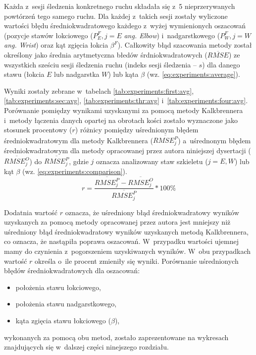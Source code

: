 Każda z~sesji śledzenia konkretnego ruchu składała się z~5 nieprzerywanych powtórzeń tego samego ruchu. Dla każdej z~takich sesji zostały wyliczone wartości błędu średniokwadratowego każdego z~wyżej wymienionych oszacowań (pozycje stawów łokciowego ($P^F_E, j = E$  \emph{ang. Elbow}) i~nadgarstkowego ($P^F_W, j = W$ \emph{ang. Wrist}) oraz kąt zgięcia łokcia $\beta^F$). Całkowity błąd szacowania metody został określony jako średnia arytmetyczna błedów śrdniokwadratowych ($\overline{RMSE}$) ze wszystkich sześciu sesji śledzenia ruchu (indeks sesji śledzenia -- $s$) dla danego stawu (łokcia $E$ lub nadgarstka $W$) lub kąta $\beta$ (wz. \ref{eq:experiments:average}).

Wyniki zostały zebrane w~tabelach \ref{tab:experiments:first:avg}, \ref{tab:experiments:sec:avg}, \ref{tab:experiments:thr:avg} i~\ref{tab:experiments:four:avg}. Porównanie pomiędzy wynikami uzyskanymi za pomocą metody Kalkbrennera i~metody łączenia danych opartej na obrotach kości zostało wyznaczone jako stosunek procentowy ($r$) różnicy pomiędzy uśrednionym błędem średniokwadratowym dla metody Kalkbrennera ($\overline{RMSE^P_j}$) a~uśrednonym błędem średniokwadratowym dla metody opracowanej przez autora niniejszej dysertacji ($\overline{RMSE^O_j}$) do $\overline{RMSE^P_j}$, gdzie $j$ oznacza analizowany staw szkieletu ($j=E, W$) lub kąt $\beta$ (wz. \ref{eq:experiments:comparison}). \\
						
\begin{equation}
	r = \frac{\overline{RMSE^P_j} - \overline{RMSE^O_j}}{\overline{RMSE^P_j}} * 100\%
	\label{eq:experiments:comparison}
\end{equation}
						
Dodatnia wartość $r$ oznacza, że uśredniony błąd średniokwadratowy wyników uzyskanych za pomocą metody opracowanej przez autora jest mniejszy niż uśredniony błąd średniokwadratowy wyników uzyskanych metodą Kalkbrennera, co oznacza, że nastąpiła poprawa oszacowań. W~przypadku wartości ujemnej mamy do czynienia z~pogorszeniem uzyskiwanych wyników. W~obu przypadkach wartość $r$ określa o~ile procent zmieniły się wyniki. Porównanie uśrednionych błędów średniokwadratowych dla oszacowań:
\begin{itemize}
	\item położenia stawu łokciowego,
	\item położenia stawu nadgarstkowego,
	\item kąta zgięcia stawu łokciowego ($\beta$),
\end{itemize}
wykonanych za pomocą obu metod, zostało zaprezentowane na wykresach znajdujących się w~dalszej części ninejszego rozdziału.
						
